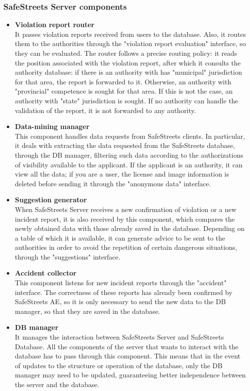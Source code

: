 \documentclass{article}
\begin{document}
		\subsubsection{SafeStreets Server components}
		\begin{itemize}
			\item \textbf{Violation report router}\\
			It passes violation reports received from users to the database. Also, it routes them to the authorities through the "violation report evaluation" interface, so they can be evaluated. The router follows a precise routing policy: it reads the position associated with the violation report, after which it consults the authority database: if there is an authority with has "municipal" jurisdiction for that area, the report is forwarded to it. Otherwise, an authority with "provincial" competence is sought for that area. If this is not the case, an authority with "state" jurisdiction is sought. If no authority can handle the validation of the report, it is not forwarded to any authority.
			\item \textbf{Data-mining manager}\\
			This component handles data requests from SafeStreets clients. In particular, it deals with extracting the data requested from the SafeStreets database, through the DB manager, filtering such data according to the authorizations of visibility available to the applicant. If the applicant is an authority, it can view all the data; if you are a user, the license and image information is deleted before sending it through the "anonymous data" interface.
			\item \textbf{Suggestion generator}\\
			When SafeStreets Server receives a new confirmation of violation or a new incident report, it is also received by this component, which compares the newly obtained data with those already saved in the database. Depending on a table of which it is available, it can generate advice to be sent to the authorities in order to avoid the repetition of certain dangerous situations, through the "suggestions" interface.
			\item \textbf{Accident collector}\\
			This component listens for new incident reports through the "accident" interface. The correctness of these reports has already been confirmed by SafeStreets AE, so it is only necessary to send the new data to the DB manager, so that they are saved in the database.
			\item \textbf{DB manager}\\
			It manages the interaction between SafeStreets Server and SafeStreets Database. All the components of the server that wants to interact with the database has to pass through this component. This means that in the event of updates to the structure or operation of the database, only the DB manager may need to be updated, guaranteeing better independence between the server and the database.
		\end{itemize}
\end{document}
